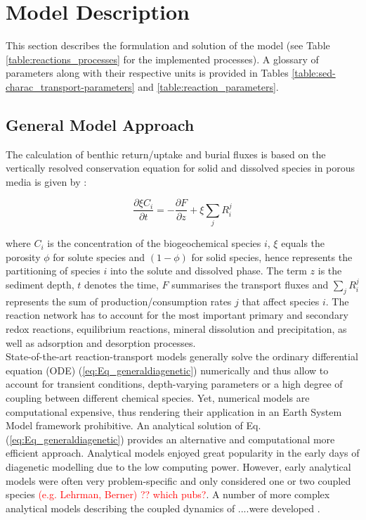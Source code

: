 \documentclass[gmd, manuscript]{copernicus}
\begin{document}
\section{Model Description}
This section describes the formulation and solution of the model (see Table \ref{table:reactions_processes} for the implemented processes). 
A glossary of parameters along with their respective units is provided in Tables \ref{table:sed-charac_transport-parameters} and \ref{table:reaction_parameters}.

\subsection {General Model Approach} \label{subsec:GeneralModelApproach}
The calculation of benthic return/uptake and burial fluxes is based on the vertically resolved conservation equation for solid and dissolved species in porous media is given by 
\citep[e.g.][]{berner_early_1980, boudreau1997diagenetic}:

\begin{equation} 
\frac{\partial \xi C_i}{\partial t}=-\frac{\partial F}{\partial z}+\xi \sum_j R_i^j \label{eq:Eq_generaldiagenetic}
\end{equation}

where $C_i$ is the concentration of the biogeochemical species $i$, $\xi$ equals the porosity $\phi$ for solute species and $(1-\phi)$ for solid species, hence represents the partitioning of species $i$ 
into the solute and dissolved phase. The term $z$ is the sediment depth, $t$ denotes the time, $F$ summarises the transport fluxes and $\sum_j R_i^j$ represents the sum of production/consumption rates $j$ 
that affect species $i$. The reaction network has to account for the most important primary and secondary redox reactions, equilibrium reactions, mineral dissolution and precipitation, as well as adsorption 
and desorption processes.\\
State-of-the-art reaction-transport models generally solve the ordinary differential equation (ODE) (\ref{eq:Eq_generaldiagenetic}) numerically and thus allow to account for transient conditions, depth-varying parameters or a high degree of coupling 
between different chemical species. Yet, numerical models are computational expensive, thus rendering their application in an Earth System Model framework prohibitive. 
An analytical solution of Eq. (\ref{eq:Eq_generaldiagenetic}) provides an alternative and computational more efficient approach. Analytical models enjoyed great popularity in the early days of diagenetic modelling 
due to the low computing power. However, early analytical models were often very problem-specific and only considered one or two coupled species  \textcolor{red}{(e.g. Lehrman, Berner) ?? which pubs?}. 
A number of more complex analytical models describing the coupled dynamics of ....were developed \citep[e.g.][]{billen1982modelling, goloway1982diagenetic, jahnke1982model}. 
\end{document}
